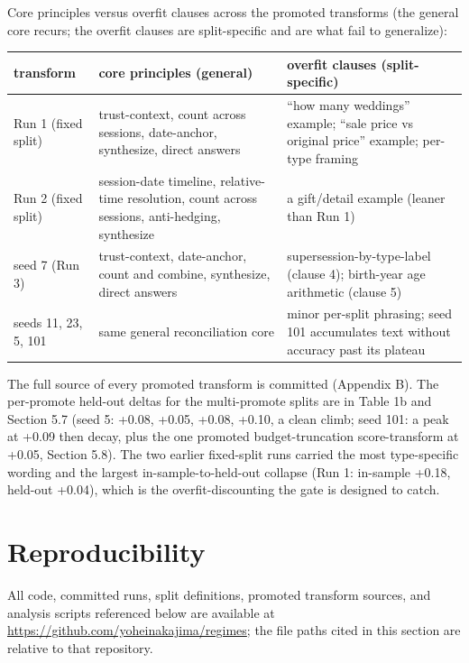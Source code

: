 Core principles versus overfit clauses across the promoted transforms (the general core recurs; the overfit clauses are split-specific and are what fail to generalize):

\begin{center}\small
\begin{tabular}{p{}p{}p{}}
\toprule
transform & core principles (general) & overfit clauses (split-specific) \\
\midrule
Run 1 (fixed split) & trust-context, count across sessions, date-anchor, synthesize, direct answers & ``how many weddings'' example; ``sale price vs original price'' example; per-type framing \\
Run 2 (fixed split) & session-date timeline, relative-time resolution, count across sessions, anti-hedging, synthesize & a gift/detail example (leaner than Run 1) \\
seed 7 (Run 3) & trust-context, date-anchor, count and combine, synthesize, direct answers & supersession-by-type-label (clause 4); birth-year age arithmetic (clause 5) \\
seeds 11, 23, 5, 101 & same general reconciliation core & minor per-split phrasing; seed 101 accumulates text without accuracy past its plateau \\
\bottomrule
\end{tabular}
\end{center}


The full source of every promoted transform is committed (Appendix B). The per-promote held-out deltas for the multi-promote splits are in Table 1b and Section 5.7 (seed 5: +0.08, +0.05, +0.08, +0.10, a clean climb; seed 101: a peak at +0.09 then decay, plus the one promoted budget-truncation score-transform at +0.05, Section 5.8). The two earlier fixed-split runs carried the most type-specific wording and the largest in-sample-to-held-out collapse (Run 1: in-sample +0.18, held-out +0.04), which is the overfit-discounting the gate is designed to catch.

\section{Reproducibility}

All code, committed runs, split definitions, promoted transform sources, and analysis scripts referenced below are available at \url{https://github.com/yoheinakajima/regimes}; the file paths cited in this section are relative to that repository.

